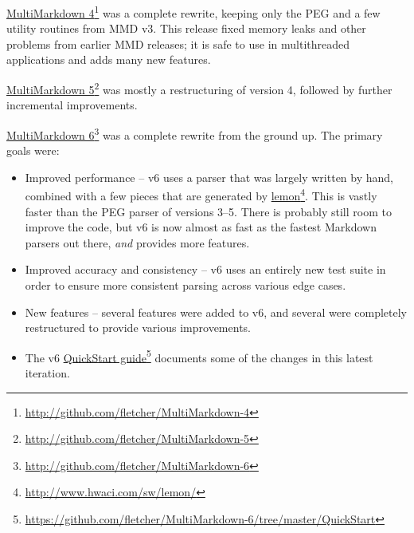 \href{http://github.com/fletcher/MultiMarkdown-4}{MultiMarkdown 4}\footnote{\href{http://github.com/fletcher/MultiMarkdown-4}{http:\slash \slash github.com\slash fletcher\slash MultiMarkdown-4}} was a complete rewrite, keeping only the PEG and a few utility routines from \gls{MMD} v3. This release fixed memory leaks and other problems from earlier \gls{MMD} releases; it is safe to use in multithreaded applications and adds many new features.

\href{http://github.com/fletcher/MultiMarkdown-5}{MultiMarkdown 5}\footnote{\href{http://github.com/fletcher/MultiMarkdown-5}{http:\slash \slash github.com\slash fletcher\slash MultiMarkdown-5}} was mostly a restructuring of version 4, followed by further incremental improvements.

\href{http://github.com/fletcher/MultiMarkdown-6}{MultiMarkdown 6}\footnote{\href{http://github.com/fletcher/MultiMarkdown-6}{http:\slash \slash github.com\slash fletcher\slash MultiMarkdown-6}} was a complete rewrite from the ground up. The primary goals were:

\begin{itemize}
\item Improved performance -- v6 uses a parser that was largely written by hand, combined with a few pieces that are generated by \href{http://www.hwaci.com/sw/lemon/}{lemon}\footnote{\href{http://www.hwaci.com/sw/lemon/}{http:\slash \slash www.hwaci.com\slash sw\slash lemon\slash }}. This is vastly faster than the PEG parser of versions 3--5. There is probably still room to improve the code, but v6 is now almost as fast as the fastest Markdown parsers out there, \emph{and} provides more features.

\item Improved accuracy and consistency -- v6 uses an entirely new test suite in order to ensure more consistent parsing across various edge cases.

\item New features -- several features were added to v6, and several were completely restructured to provide various improvements.

\item The v6 \href{https://github.com/fletcher/MultiMarkdown-6/tree/master/QuickStart}{QuickStart guide}\footnote{\href{https://github.com/fletcher/MultiMarkdown-6/tree/master/QuickStart}{https:\slash \slash github.com\slash fletcher\slash MultiMarkdown-6\slash tree\slash master\slash QuickStart}} documents some of the changes in this latest iteration.

\end{itemize}

